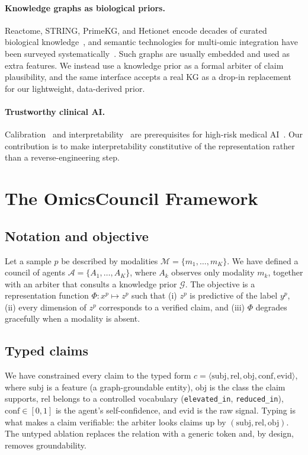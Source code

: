 \documentclass[runningheads]{llncs}
\begin{document}
\paragraph{Knowledge graphs as biological priors.}
Reactome, STRING, PrimeKG, and Hetionet encode decades of curated biological knowledge~\cite{gillespie2022reactome,szklarczyk2023string,chandak2023primekg,himmelstein2017hetionet}, and semantic technologies for multi-omic integration have been surveyed systematically~\cite{defilippis2025semantic}. Such graphs are usually embedded and used as extra features. We instead use a knowledge prior as a formal arbiter of claim plausibility, and the same interface accepts a real KG as a drop-in replacement for our lightweight, data-derived prior.

\paragraph{Trustworthy clinical AI.}
Calibration~\cite{guo2017calibration} and interpretability~\cite{lundberg2017shap} are prerequisites for high-risk medical AI~\cite{euaiact2024}. Our contribution is to make interpretability constitutive of the representation rather than a reverse-engineering step.

\section{The OmicsCouncil Framework}
\subsection{Notation and objective}
Let a sample $p$ be described by modalities $\mathcal{M}=\{m_1,\dots,m_K\}$. We have defined a council of agents $\mathcal{A}=\{A_1,\dots,A_K\}$, where $A_k$ observes only modality $m_k$, together with an arbiter that consults a knowledge prior $\mathcal{G}$. The objective is a representation function $\Phi: x^p \mapsto z^p$ such that (i) $z^p$ is predictive of the label $y^p$, (ii) every dimension of $z^p$ corresponds to a verified claim, and (iii) $\Phi$ degrades gracefully when a modality is absent.

\subsection{Typed claims}
We have constrained every claim to the typed form $c = \langle \mathrm{subj}, \mathrm{rel}, \mathrm{obj}, \mathrm{conf}, \mathrm{evid}\rangle$, where $\mathrm{subj}$ is a feature (a graph-groundable entity), $\mathrm{obj}$ is the class the claim supports, $\mathrm{rel}$ belongs to a controlled vocabulary (\texttt{elevated\_in}, \texttt{reduced\_in}), $\mathrm{conf}\in[0,1]$ is the agent's self-confidence, and $\mathrm{evid}$ is the raw signal. Typing is what makes a claim verifiable: the arbiter looks claims up by $(\mathrm{subj},\mathrm{rel},\mathrm{obj})$. The untyped ablation replaces the relation with a generic token and, by design, removes groundability.
\end{document}
